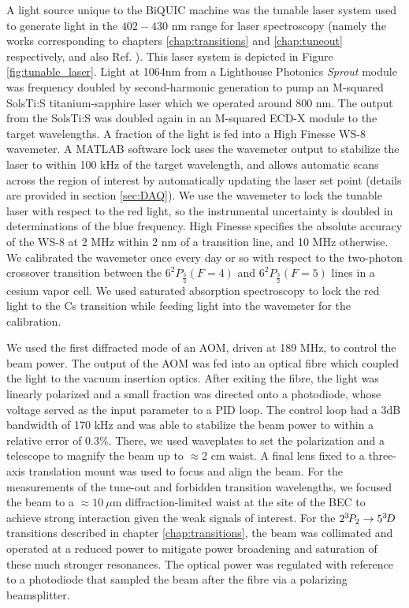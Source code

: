 	A light source unique to the BiQUIC machine was the tunable laser system used to generate light in the $402-430$ nm range for laser spectroscopy (namely the works \cite{Ross20,Henson22} corresponding to chapters \ref{chap:transitions} and \ref{chap:tuneout} respectively, and also Ref. \cite{Thomas20}).
	This laser system is depicted in Figure \ref{fig:tunable_laser}.
	Light at 1064nm from a Lighthouse Photonics \emph{Sprout} module was frequency doubled by second-harmonic generation to pump an M-squared SolsTi:S titanium-sapphire laser which we operated around 800 nm.
	The output from the SolsTi:S was doubled again in an M-squared ECD-X module to the target wavelengths.
	A fraction of the light is fed into a High Finesse WS-8 wavemeter.
	A MATLAB software lock uses the wavemeter output to stabilize the laser to within 100 kHz of the target wavelength, and allows automatic scans across the region of interest by automatically updating the laser set point (details are provided in section \ref{sec:DAQ}).
	We use the wavemeter to lock the tunable laser with respect to the red light, so the instrumental uncertainty is doubled in determinations of the blue frequency.
	High Finesse specifies the absolute accuracy of the WS-8 at 2 MHz within 2 nm of a transition line, and 10 MHz otherwise.
	We calibrated the wavemeter once every day or so with respect to the two-photon crossover transition between the $6^2P_{\frac{3}{2}} (F=4)$ and $6^2P_{\frac{3}{2}} (F=5)$ lines in a cesium vapor cell.
	We used saturated absorption spectroscopy to lock the red light to the Cs transition while feeding light into the wavemeter for the calibration.	
	

	We used the first diffracted mode of an AOM, driven at 189 MHz, to control the beam power.
	The output of the AOM was fed into an optical fibre which coupled the light to the vacuum insertion optics.
	{After exiting the fibre, the light was linearly polarized and a small fraction was directed onto a photodiode, whose voltage served as the input parameter to a PID loop.
	The control loop had a 3dB bandwidth of 170 kHz and was able to stabilize the beam power to within a relative error of 0.3\%.}
	There, we used waveplates to set the polarization and a telescope to magnify the beam up to $\approx$2 cm waist.
	A final lens fixed to a three-axis translation mount was used to focus and align the beam.
	For the measurements of the tune-out and forbidden transition wavelengths, we focused the beam to a $\approx10~\mu$m diffraction-limited waist at the site of the BEC to achieve strong interaction given the weak signals of interest.
	For the $2^{3\!} P_2\rightarrow 5^{3\!} D$ transitions described in chapter \ref{chap:transitions}, the beam was collimated and operated at a reduced power to mitigate power broadening and saturation of these much stronger resonances.
	The optical power was regulated with reference to a photodiode that sampled the beam after the fibre via a polarizing beamsplitter.

